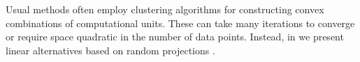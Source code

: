 
Usual methods often employ clustering algorithms for constructing convex combinations of
computational units. These can take many iterations to converge or require space quadratic in the
number of data points. Instead, in  we present linear alternatives based on random
projections \citep{dasgupta08a,dasgupta08b}.
